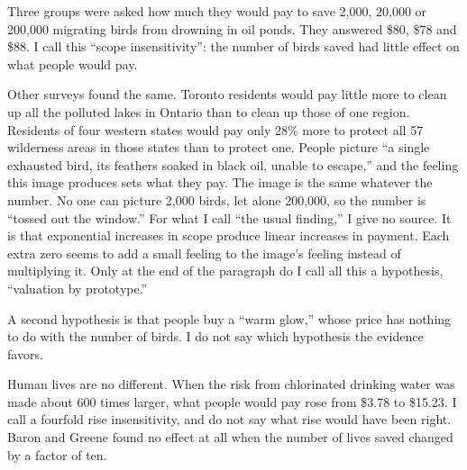 
Three groups were asked how much they would pay to save 2,000, 20,000 or 200,000 migrating birds from drowning in oil ponds. They answered \$80, \$78 and \$88. I call this ``scope insensitivity'': the number of birds saved had little effect on what people would pay. 

Other surveys found the same. Toronto residents would pay little more to clean up all the polluted lakes in Ontario than to clean up those of one region. Residents of four western states would pay only 28\% more to protect all 57 wilderness areas in those states than to protect one. People picture ``a single exhausted bird, its feathers soaked in black oil, unable to escape,'' and the feeling this image produces sets what they pay. The image is the same whatever the number. No one can picture 2,000 birds, let alone 200,000, so the number is ``tossed out the window.''  For what I call ``the usual finding,'' I give no source. It is that exponential increases in scope produce linear increases in payment. Each extra zero seems to add a small feeling to the image's feeling instead of multiplying it.  Only at the end of the paragraph do I call all this a hypothesis, ``valuation by prototype.''

A second hypothesis is that people buy a ``warm glow,'' whose price has nothing to do with the number of birds. I do not say which hypothesis the evidence favors.

Human lives are no different. When the risk from chlorinated drinking water was made about 600 times larger, what people would pay rose from \$3.78 to \$15.23. I call a fourfold rise insensitivity, and do not say what rise would have been right. Baron and Greene found no effect at all when the number of lives saved changed by a factor of ten.

